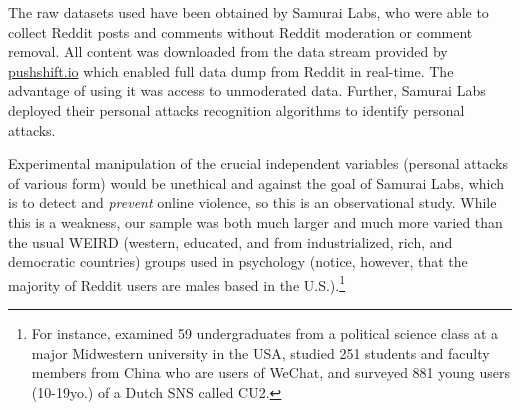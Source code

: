 \documentclass[a4paper,fleqn]{cas-dc}
\begin{document}
The raw datasets used have been obtained by \textsf{Samurai Labs}, who were able to collect \textsf{Reddit} posts and comments without \textsf{Reddit} moderation or comment removal. All content was downloaded from the data stream provided by \url{pushshift.io} which enabled full data dump from Reddit in real-time. The advantage of using it was access to unmoderated data.  Further, \textsf{Samurai Labs} deployed their personal attacks recognition algorithms to identify personal attacks.


Experimental manipulation of the crucial independent variables (personal attacks of various form)  would be unethical and against the goal of \textsf{Samurai Labs}, which is to detect and \emph{prevent} online violence, so this is an observational study. While this  is a weakness, our sample was both much larger and much more varied than the usual WEIRD (western, educated, and from industrialized, rich, and democratic countries) groups used in psychology (notice, however, that the majority of Reddit users  are males based in the U.S.).\footnote{For instance,  \citet{wise2006moderation} examined  59 undergraduates from a political science class at a major Midwestern university in the USA, \citet{zong2019social} studied 251 students and faculty members from China who are users of WeChat, and  \citet{valkenburg2006friend} surveyed  881 young users (10-19yo.) of a Dutch SNS called CU2.}
\end{document}
